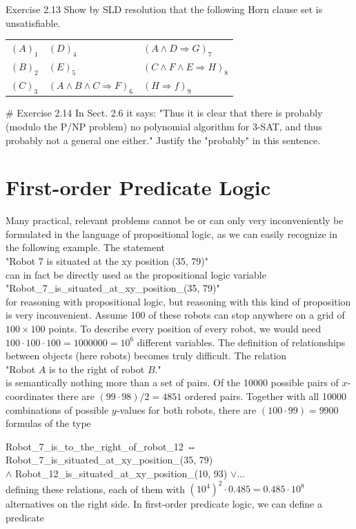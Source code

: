 \documentclass[10pt]{article}
\begin{document}
Exercise 2.13 Show by SLD resolution that the following Horn clause set is unsatisfiable.

\begin{center}
\begin{tabular}{lll}
$(A)_{1}$ & $(D)_{4}$ & $(A \wedge D \Rightarrow G)_{7}$ \\
$(B)_{2}$ & $(E)_{5}$ & $(C \wedge F \wedge E \Rightarrow H)_{8}$ \\
$(C)_{3}$ & $(A \wedge B \wedge C \Rightarrow F)_{6}$ & $(H \Rightarrow f)_{9}$ \\
\end{tabular}
\end{center}

\# Exercise 2.14 In Sect. 2.6 it says: "Thus it is clear that there is probably (modulo the P/NP problem) no polynomial algorithm for 3-SAT, and thus probably not a general one either." Justify the "probably" in this sentence.

\section*{First-order Predicate Logic}
Many practical, relevant problems cannot be or can only very inconveniently be formulated in the language of propositional logic, as we can easily recognize in the following example. The statement\\
"Robot 7 is situated at the xy position (35, 79)"\\
can in fact be directly used as the propositional logic variable\\
"Robot\_7\_is\_situated\_at\_xy\_position\_(35, 79)"\\
for reasoning with propositional logic, but reasoning with this kind of proposition is very inconvenient. Assume 100 of these robots can stop anywhere on a grid of $100 \times 100$ points. To describe every position of every robot, we would need $100 \cdot 100 \cdot 100=1000000=10^{6}$ different variables. The definition of relationships between objects (here robots) becomes truly difficult. The relation\\
"Robot $A$ is to the right of robot $B$."\\
is semantically nothing more than a set of pairs. Of the 10000 possible pairs of $x$-coordinates there are $(99 \cdot 98) / 2=4851$ ordered pairs. Together with all 10000 combinations of possible $y$-values for both robots, there are $(100 \cdot 99)=9900$ formulas of the type

Robot\_7\_is\_to\_the\_right\_of\_robot\_12 ⇔\\
Robot\_7\_is\_situated\_at\_xy\_position\_(35, 79)\\
$\wedge$ Robot\_12\_is\_situated\_at\_xy\_position\_(10, 93) $\vee \ldots$\\
defining these relations, each of them with $\left(10^{4}\right)^{2} \cdot 0.485=0.485 \cdot 10^{8}$ alternatives on the right side. In first-order predicate logic, we can define a predicate
\end{document}
